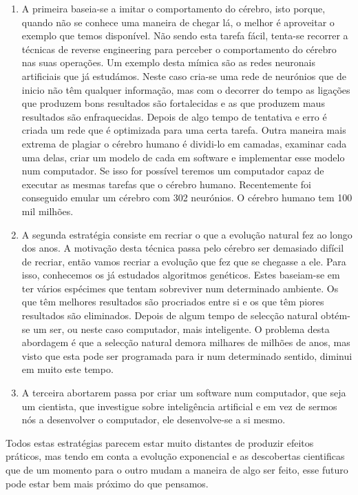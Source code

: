 \documentclass[runningheads,a4paper]{llncs}
\begin{document}
\begin{enumerate}
  \item A primeira baseia-se a imitar o comportamento do cérebro, isto porque, quando não se conhece uma maneira de chegar lá, o melhor é aproveitar o exemplo que temos disponível.
Não sendo esta tarefa fácil, tenta-se recorrer a técnicas de reverse engineering para perceber o comportamento do cérebro nas suas operações. Um exemplo desta mímica são as redes neuronais artificiais que já estudámos. Neste caso cria-se uma rede de neurónios que de inicio não têm qualquer informação, mas com o decorrer do tempo as ligações que produzem bons resultados são fortalecidas e as que produzem maus resultados são enfraquecidas. Depois de algo tempo de tentativa e erro é criada um rede que é optimizada para uma certa tarefa.
Outra maneira mais extrema de plagiar o cérebro humano é dividi-lo em camadas, examinar cada uma delas, criar um modelo de cada em software e implementar esse modelo num computador. Se isso for possível teremos um computador capaz de executar as mesmas tarefas que o cérebro humano. Recentemente foi conseguido emular um cérebro com 302 neurónios. O cérebro humano tem 100 mil milhões.
  \item A segunda estratégia consiste em recriar o que a evolução natural fez ao longo dos anos. A motivação desta técnica passa pelo cérebro ser demasiado difícil de recriar, então vamos recriar a evolução que fez que se chegasse a ele.
Para isso, conhecemos os já estudados algoritmos genéticos. Estes baseiam-se em ter vários espécimes que tentam sobreviver num determinado ambiente. Os que têm melhores resultados são procriados entre si e os que têm piores resultados são eliminados. Depois de algum tempo de selecção natural obtém-se um ser, ou neste caso computador, mais inteligente.
O problema desta abordagem é que a selecção natural demora milhares de milhões de anos, mas visto que esta pode ser programada para ir num determinado sentido, diminui em muito este tempo.
  \item A terceira abortarem passa por criar um software num computador, que seja um cientista, que investigue sobre inteligência artificial e em vez de sermos nós a desenvolver o computador, ele desenvolve-se a si mesmo.
\end{enumerate}

Todos estas estratégias parecem estar muito distantes de produzir efeitos práticos, mas tendo em conta a evolução exponencial e as descobertas cientificas que de um momento para o outro mudam a maneira de algo ser feito, esse futuro pode estar bem mais próximo do que pensamos.
\end{document}
